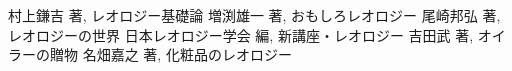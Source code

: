 \begin{thebibliography}{99}
	村上鎌吉 著, レオロジー基礎論
	増渕雄一 著, おもしろレオロジー
	尾崎邦弘 著, レオロジーの世界
	日本レオロジー学会 編, 新講座・レオロジー
	吉田武 著, オイラーの贈物
	名畑嘉之 著, 化粧品のレオロジー
\end{thebibliography}
